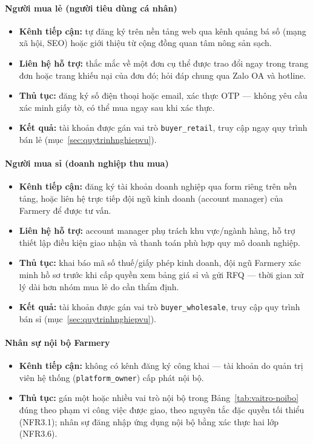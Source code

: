 \paragraph*{Người mua lẻ (người tiêu dùng cá nhân)}
\begin{itemize}
    \item \textbf{Kênh tiếp cận:} tự đăng ký trên nền tảng web qua kênh quảng bá số (mạng xã hội, SEO) hoặc giới thiệu từ cộng đồng quan tâm nông sản sạch.
    \item \textbf{Liên hệ hỗ trợ:} thắc mắc về một đơn cụ thể được trao đổi ngay trong trang đơn hoặc trang khiếu nại của đơn đó; hỏi đáp chung qua Zalo OA và hotline.
    \item \textbf{Thủ tục:} đăng ký số điện thoại hoặc email, xác thực OTP --- không yêu cầu xác minh giấy tờ, có thể mua ngay sau khi xác thực.
    \item \textbf{Kết quả:} tài khoản được gán vai trò \texttt{buyer\_retail}, truy cập ngay quy trình bán lẻ (mục~\ref{sec:quytrinhnghiepvu}).
\end{itemize}

\paragraph*{Người mua sỉ (doanh nghiệp thu mua)}
\begin{itemize}
    \item \textbf{Kênh tiếp cận:} đăng ký tài khoản doanh nghiệp qua form riêng trên nền tảng, hoặc liên hệ trực tiếp đội ngũ kinh doanh (account manager) của Farmery để được tư vấn.
    \item \textbf{Liên hệ hỗ trợ:} account manager phụ trách khu vực/ngành hàng, hỗ trợ thiết lập điều kiện giao nhận và thanh toán phù hợp quy mô doanh nghiệp.
    \item \textbf{Thủ tục:} khai báo mã số thuế/giấy phép kinh doanh, đội ngũ Farmery xác minh hồ sơ trước khi cấp quyền xem bảng giá sỉ và gửi RFQ --- thời gian xử lý dài hơn nhóm mua lẻ do cần thẩm định.
    \item \textbf{Kết quả:} tài khoản được gán vai trò \texttt{buyer\_wholesale}, truy cập quy trình bán sỉ (mục~\ref{sec:quytrinhnghiepvu}).
\end{itemize}

\paragraph*{Nhân sự nội bộ Farmery}
\begin{itemize}
    \item \textbf{Kênh tiếp cận:} không có kênh đăng ký công khai --- tài khoản do quản trị viên hệ thống (\texttt{platform\_owner}) cấp phát nội bộ.
    \item \textbf{Thủ tục:} gán một hoặc nhiều vai trò nội bộ trong Bảng~\ref{tab:vaitro-noibo} đúng theo phạm vi công việc được giao, theo nguyên tắc đặc quyền tối thiểu (NFR3.1); nhân sự đăng nhập ứng dụng nội bộ bằng xác thực hai lớp (NFR3.6).
\end{itemize}

